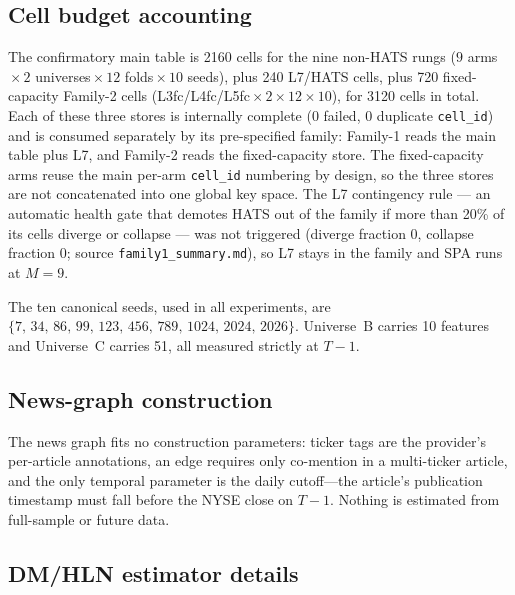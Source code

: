 \documentclass{article}
\begin{document}
\subsection{Cell budget accounting}\label{app:setup:cells}

The confirmatory main table is 2160 cells for the nine non-HATS rungs ($9$ arms${}\times{}2$ universes${}\times{}12$ folds${}\times{}10$ seeds), plus 240 L7/HATS cells, plus 720 fixed-capacity Family-2 cells (L3fc/L4fc/L5fc${}\times{}2\times{}12\times{}10$), for 3120 cells in total. Each of these three stores is internally complete (0 failed, 0 duplicate \texttt{cell\_id}) and is consumed separately by its pre-specified family: Family-1 reads the main table plus L7, and Family-2 reads the fixed-capacity store. The fixed-capacity arms reuse the main per-arm \texttt{cell\_id} numbering by design, so the three stores are not concatenated into one global key space.
The L7 contingency rule --- an automatic health gate that demotes HATS out of the family if more than 20\% of its cells diverge or collapse --- was not triggered (diverge fraction 0, collapse fraction 0; source \texttt{family1\_summary.md}), so L7 stays in the family and SPA runs at $M=9$.

The ten canonical seeds, used in all experiments, are $\{7,\,34,\,86,\,99,\,123,\,456,\,789,\,1024,\,2024,\,2026\}$. Universe~B carries 10 features and Universe~C carries 51, all measured strictly at $T-1$.

\subsection{News-graph construction}\label{app:setup:news}

The news graph fits no construction parameters: ticker tags are the provider's per-article annotations, an edge requires only co-mention in a multi-ticker article, and the only temporal parameter is the daily cutoff---the article's publication timestamp must fall before the NYSE close on $T-1$. Nothing is estimated from full-sample or future data.

\subsection{DM/HLN estimator details}\label{app:setup:dmhln}
\end{document}
